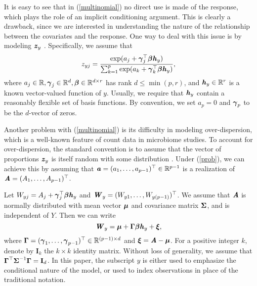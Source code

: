 \documentclass[12pt]{article}
\def \bfita{\mbox{\textbf{\textit{a}}}}
\def \bfith{\mbox{\textbf{\textit{h}}}}
\def \bfitz{\mbox{\textbf{\textit{z}}}}
\def \bfitA{\mbox{\textbf{\textit{A}}}}
\def \bfitW{\mbox{\textbf{\textit{W}}}}
\def \bfbeta{\mbox{\boldmath $\beta$}}
\def \bfgamma{\mbox{\boldmath $\gamma$}}
\def \bfmu{\mbox{\boldmath $\mu$}}
\def \bfxi{\mbox{\boldmath $\xi$}}
\def \I{\mathbf{I}}
\def \bfGamma{\mbox{\boldmath $\Gamma$}}
\def \bfSigma{\mbox{\boldmath $\Sigma$}}
\begin{document}
It is easy to see that in (\ref{multinomial}) no direct use is made of the response, which plays the role of an implicit conditioning argument. This is clearly a drawback, since we are interested in understanding the nature of the relationship between the covariates and the response. One way to deal with this issue is by modeling $\bfitz_y$ \citep{cook2007fisher, taddy2010multinomial}. Specifically, we assume that
\begin{equation}\label{prob}
z_{yj} = \frac{\exp(a_j + \bfgamma_j^{\top} \bfbeta \bfith_y)}{\sum_{k = 1}^{p}\exp(a_k + \bfgamma_k^{\top} \bfbeta \bfith_y)},
\end{equation}
where $a_j \in \mathbb{R}, \bfgamma_j \in \mathbb{R}^{d}, \bfbeta \in \mathbb{R}^{d \times r}$ has rank $d \leq \min(p, r)$, and $\bfith_y  \in \mathbb{R}^r$ is a known vector-valued function of $y$. Usually, we require that $\bfith_y$ contain a reasonably flexible set of basis functions. By convention, we set $a_p = 0$ and $\bfgamma_p$ to be the $d$-vector of zeros.

Another problem with (\ref{multinomial}) is its difficulty in modeling over-dispersion, which is a well-known feature of count data in microbiome studies. To account for over-dispersion, the standard convention is to assume that the vector of proportions $\bfitz_{y}$ is itself random with some distribution \citep{chen2013variable, xia2013logistic}. Under (\ref{prob}), we can achieve this by assuming that $\bfita = (a_1, \ldots, a_{p - 1})^{\top} \in \mathbb{R}^{p - 1}$ is a realization of $\bfitA = (A_1, \ldots, A_{p - 1})^{\top}$.

Let $W_{yj} = A_j + \bfgamma_j^{\top} \bfbeta \bfith_y$ and $\bfitW_{y} = (W_{y1}, \ldots, W_{y(p - 1)})^{\top}$. We assume that $\bfitA$ is normally distributed with mean vector $\bfmu$ and covariance matrix $\bfSigma$, and is independent of $Y$. Then we can write
\begin{equation}\label{linear}
\bfitW_y = \bfmu + \bfGamma \bfbeta \bfith_y + \bfxi,
\end{equation}
where $\bfGamma = (\bfgamma_1, \ldots, \bfgamma_{p - 1})^{\top} \in \mathbb{R}^{(p - 1) \times d}$ and $\bfxi = \bfitA - \bfmu$. For a positive integer $k$, denote by $\I_{k}$ the $k \times k$ identity matrix. Without loss of generality, we assume that $\bfGamma^{\top} \bfSigma^{-1} \bfGamma = \I_d$. In this paper, the subscript $y$ is either used to emphasize the conditional nature of the model, or used to index observations in place of the traditional notation.
\end{document}
